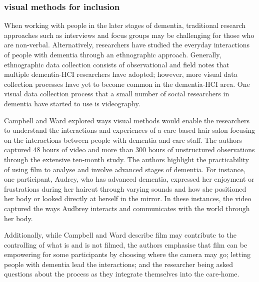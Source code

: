 \subsubsection{visual methods for inclusion}
When working with people in the later stages of dementia, traditional research approaches such as interviews and focus groups may be challenging for those who are non-verbal. Alternatively, researchers have studied the everyday interactions of people with dementia through an ethnographic approach. Generally, ethnographic data collection consists of observational and field notes that multiple dementia-HCI researchers have adopted; however, more visual data collection processes have yet to become common in the dementia-HCI area. One visual data collection process that a small number of social researchers in dementia have started to use is videography.

Campbell and Ward explored ways visual methods would enable the researchers to understand the interactions and experiences of a care-based hair salon focusing on the interactions between people with dementia and care staff. The authors captured 48 hours of video and more than 300 hours of unstructured observations through the extensive ten-month study. The authors highlight the practicability of using film to analyse and involve advanced stages of dementia. For instance, one participant, Audrey, who has advanced dementia, expressed her enjoyment or frustrations during her haircut through varying sounds and how she positioned her body or looked directly at herself in the mirror. In these instances, the video captured the ways Audbrey interacts and communicates with the world through her body. 

Additionally, while Campbell and Ward describe film may contribute to the controlling of what is and is not filmed, the authors emphasise that film can be empowering for some participants by choosing where the camera may go; letting people with dementia lead the interactions; and the researcher being asked questions about the process as they integrate themselves into the care-home. 

